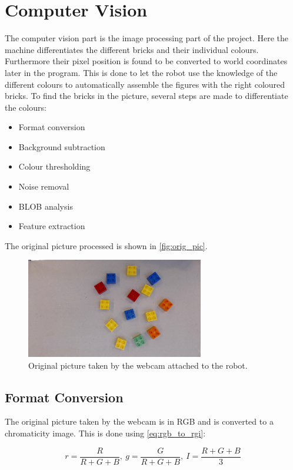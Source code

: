 \chapter{Computer Vision}\label{ch:img_proc}
The computer vision part is the image processing part of the project. Here the machine differentiates the different \lego bricks and their individual colours. Furthermore their pixel position is found to be converted to world coordinates later in the program.
This is done to let the robot use the knowledge of the different colours to automatically assemble the figures with the right coloured bricks.
To find the bricks in the picture, several steps are made to differentiate the colours:

\begin{itemize}
	\item Format conversion
	\item Background subtraction
	\item Colour thresholding
	\item Noise removal
	\item BLOB analysis
	\item Feature extraction
\end{itemize}

The original picture processed is shown in \autoref{fig:orig_pic}.

\begin{figure}
	\centering
	\includegraphics[width=0.69\textwidth]{figures/orig_pic.jpg}
	\caption{Original picture taken by the webcam attached to the robot.}
	\label{fig:orig_pic}
\end{figure}

\section{Format Conversion}
The original picture taken by the webcam is in RGB and is converted to a chromaticity image. This is done using \autoref{eq:rgb_to_rgi}:

\begin{equation}\label{eq:rgb_to_rgi}
	r=\frac{R}{R+G+B}, ~g=\frac{G}{R+G+B}, ~I=\frac{R+G+B}{3}
\end{equation}

